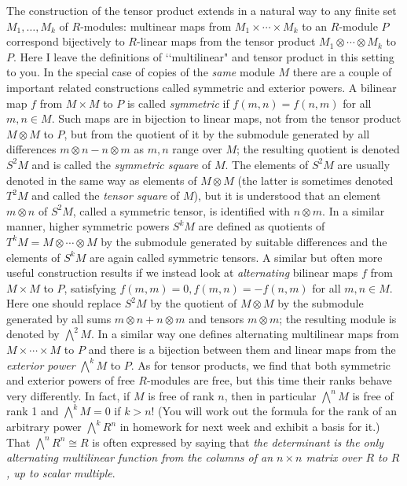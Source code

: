 \documentclass[10pt]{article}
\begin{document}
The construction of the tensor product extends in a natural way to any
finite set $M_1,\ldots,M_k$ of $R$-modules: multinear maps from
$M_1\times\cdots\times M_k$ to an $R$-module $P$ correspond bijectively
to $R$-linear maps from the tensor product $M_1\otimes\cdots\otimes M_k$
to $P$. Here I leave the definitions of \lq\lq multilinear" and tensor
product in this setting to you. In the special case of copies of the
{\sl same} module $M$ there are a couple of important related
constructions called symmetric and exterior powers. A bilinear map $f$
from $M\times M$ to $P$ is called {\sl symmetric} if $f(m,n) = f(n,m)$
for all $m,n\in M$. Such maps are in bijection to linear maps, not from
the tensor product $M\otimes M$ to $P$, but from the quotient of it by
the submodule generated by all differences $m\otimes n - n\otimes m$ as
$m,n$ range over $M$; the resulting quotient is denoted $S^2 M$ and is
called the {\sl symmetric square} of $M$. The elements of $S^2 M$ are
usually denoted in the same way as elements of $M\otimes M$ (the latter
is sometimes denoted $T^2 M$ and called the {\sl tensor square} of $M$),
but it is understood that an element $m\otimes n$ of $S^2 M$, called a
symmetric tensor, is identified with $n\otimes m$. In a similar manner,
higher symmetric powers $S^k M$ are defined as quotients of $T^k M =
M\otimes\cdots\otimes M$ by the submodule generated by suitable
differences and the elements of $S^k M$ are again called symmetric
tensors. A similar but often more useful construction results if we
instead look at {\sl alternating} bilinear maps $f$ from $M\times M$ to
$P$, satisfying $f(m,m) = 0, f(m,n) = -f(n,m)$ for all $m,n\in M$. Here
one should replace $S^2 M$ by the quotient of $M\otimes M$ by the
submodule generated by all sums $m\otimes n + n\otimes m$ and tensors
$m\otimes m$; the resulting module is denoted by $\bigwedge^2 M$. In a
similar way one defines alternating multilinear maps from
$M\times\cdots\times M$ to $P$ and there is a bijection between them and
linear maps from the {\sl exterior power} $\bigwedge^k M$ to $P$. As for
tensor products, we find that both symmetric and exterior powers of free
$R$-modules are free, but this time their ranks behave very differently.
In fact, if $M$ is free of rank $n$, then in particular $\bigwedge^n M$
is free of rank 1 and $\bigwedge^k M = 0$ if $k>n$! (You will work out
the formula for the rank of an arbitrary power $\bigwedge^k R^n$ in
homework for next week and exhibit a basis for it.) That $\bigwedge^n
R^n\cong R$ is often expressed by saying that {\sl the determinant is
  the only alternating multilinear function from the columns of an
  $n\times n$ matrix over $R$ to $R$, up to scalar multiple}.
\end{document}
